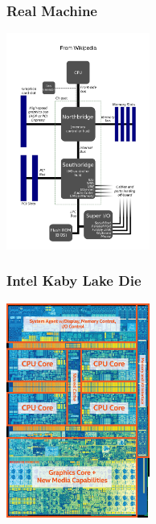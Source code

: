 \documentclass{beamer}
\begin{document}
\begin{frame}%
\frametitle{Real Machine}

\vspace{-0.2cm}

\begin{center}
\includegraphics[width=4.7cm]{motherboard.pdf}
\end{center}

\end{frame}

\begin{frame}%
\frametitle{Intel Kaby Lake Die}

\vspace{-0.2cm}

\begin{center}
\includegraphics[width=4.7cm]{kabylakedie.jpg}
\end{center}

\end{frame}
\end{document}
